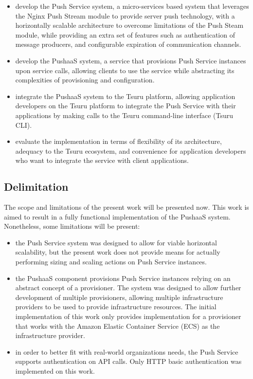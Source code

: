 \begin{itemize}
    \item develop the Push Service system, a micro-services based system that leverages the Nginx Push Stream \cite{sitePushStream} module to provide server push technology, with a horizontally scalable architecture to overcome limitations of the Push Steam module, while providing an extra set of features such as authentication of message producers, and configurable expiration of communication channels.
    \item develop the PushaaS system, a service that provisions Push Service instances upon service calls, allowing clients to use the service while abstracting its complexities of provisioning and configuration.
    \item integrate the PushaaS system to the Tsuru platform, allowing application developers on the Tsuru platform to integrate the Push Service with their applications by making calls to the Tsuru command-line interface (Tsuru CLI).
    \item evaluate the implementation in terms of flexibility of its architecture, adequacy to the Tsuru ecosystem, and convenience for application developers who want to integrate the service with client applications.
\end{itemize}


\subsection{Delimitation}

The scope and limitations of the present work will be presented now. This work is aimed to result in a fully functional implementation of the PushaaS system. Nonetheless, some limitations will be present:

\begin{itemize}
    \item the Push Service system was designed to allow for viable horizontal scalability, but the present work does not provide means for actually performing sizing and scaling actions on Push Service instances.
    \item the PushaaS component provisions Push Service instances relying on an abstract concept of a provisioner. The system was designed to allow further development of multiple provisioners, allowing multiple infrastructure providers to be used to provide infrastructure resources. The initial implementation of this work only provides implementation for a provisioner that works with the Amazon Elastic Container Service (ECS) as the infrastructure provider.
    \item in order to better fit with real-world organizations needs, the Push Service supports authentication on API calls. Only HTTP basic authentication was implemented on this work.
\end{itemize}

